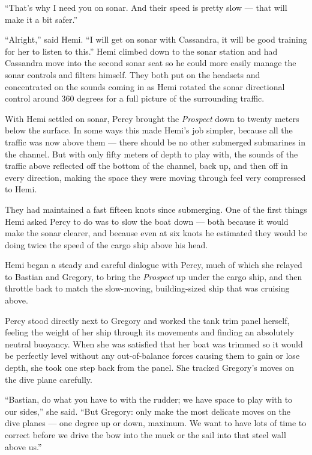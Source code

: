\documentclass[
]{scrbook}
\begin{document}
``That's why I need you on sonar. And their speed is pretty slow ---
that will make it a bit safer.''

``Alright,'' said Hemi. ``I will get on sonar with Cassandra, it will be
good training for her to listen to this.'' Hemi climbed down to the
sonar station and had Cassandra move into the second sonar seat so he
could more easily manage the sonar controls and filters himself. They
both put on the headsets and concentrated on the sounds coming in as
Hemi rotated the sonar directional control around 360 degrees for a full
picture of the surrounding traffic.

With Hemi settled on sonar, Percy brought the \emph{Prospect} down to
twenty meters below the surface. In some ways this made Hemi's job
simpler, because all the traffic was now above them --- there should be
no other submerged submarines in the channel. But with only fifty meters
of depth to play with, the sounds of the traffic above reflected off the
bottom of the channel, back up, and then off in every direction, making
the space they were moving through feel very compressed to Hemi.

They had maintained a fast fifteen knots since submerging. One of the
first things Hemi asked Percy to do was to slow the boat down --- both
because it would make the sonar clearer, and because even at six knots
he estimated they would be doing twice the speed of the cargo ship above
his head.

Hemi began a steady and careful dialogue with Percy, much of which she
relayed to Bastian and Gregory, to bring the \emph{Prospect} up under
the cargo ship, and then throttle back to match the slow-moving,
building-sized ship that was cruising above.

Percy stood directly next to Gregory and worked the tank trim panel
herself, feeling the weight of her ship through its movements and
finding an absolutely neutral buoyancy. When she was satisfied that her
boat was trimmed so it would be perfectly level without any
out-of-balance forces causing them to gain or lose depth, she took one
step back from the panel. She tracked Gregory's moves on the dive plane
carefully.

``Bastian, do what you have to with the rudder; we have space to play
with to our sides,'' she said. ``But Gregory: only make the most
delicate moves on the dive planes --- one degree up or down, maximum. We
want to have lots of time to correct before we drive the bow into the
muck or the sail into that steel wall above us.''
\end{document}
